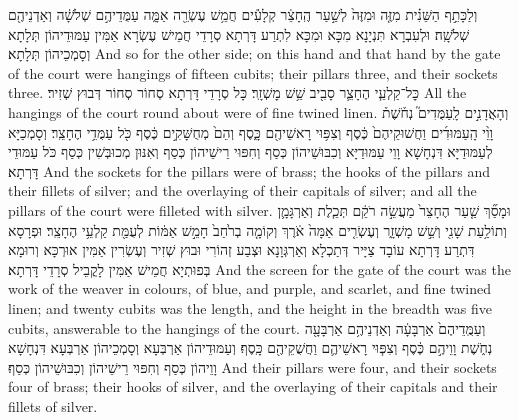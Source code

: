 {וְלַכָּתֵ֣ף הַשֵּׁנִ֗ית מִזֶּ֤ה וּמִזֶּה֙ לְשַׁ֣עַר הֶֽחָצֵ֔ר קְלָעִ֕ים חֲמֵ֥שׁ עֶשְׂרֵ֖ה אַמָּ֑ה עַמֻּדֵיהֶ֣ם שְׁלֹשָׁ֔ה וְאַדְנֵיהֶ֖ם שְׁלֹשָֽׁה׃}
{וּלְעִבְרָא תִּנְיָנָא מִכָּא וּמִכָּא לִתְרַע דָּרְתָא סְרָדֵי חֲמֵישׁ עֶשְׂרָא אַמִּין עַמּוּדֵיהוֹן תְּלָתָא וְסָמְכֵיהוֹן תְּלָתָא׃}
{And so for the other side; on this hand and that hand by the gate of the court were hangings of fifteen cubits; their pillars three, and their sockets three.}{}
{כׇּל־קַלְעֵ֧י הֶחָצֵ֛ר סָבִ֖יב שֵׁ֥שׁ מׇשְׁזָֽר׃}
{כָּל סְרָדֵי דָּרְתָא סְחוֹר סְחוֹר דְּבוּץ שְׁזִיר׃}
{All the hangings of the court round about were of fine twined linen.}{}
{וְהָאֲדָנִ֣ים לָֽעַמֻּדִים֮ נְחֹ֒שֶׁת֒ וָוֵ֨י הָֽעַמּוּדִ֜ים וַחֲשׁוּקֵיהֶם֙ כֶּ֔סֶף וְצִפּ֥וּי רָאשֵׁיהֶ֖ם כָּ֑סֶף וְהֵם֙ מְחֻשָּׁקִ֣ים כֶּ֔סֶף כֹּ֖ל עַמֻּדֵ֥י הֶחָצֵֽר׃}
{וְסָמְכַיָּא לְעַמּוּדַיָּא דִּנְחָשָׁא וָוֵי עַמּוּדַיָּא וְכִבּוּשֵׁיהוֹן כְּסַף וְחִפּוּי רֵישֵׁיהוֹן כְּסַף וְאִנּוּן מְכוּבְּשִׁין כְּסַף כֹּל עַמּוּדֵי דָּרְתָא׃}
{And the sockets for the pillars were of brass; the hooks of the pillars and their fillets of silver; and the overlaying of their capitals of silver; and all the pillars of the court were filleted with silver.}{}
{וּמָסַ֞ךְ שַׁ֤עַר הֶחָצֵר֙ מַעֲשֵׂ֣ה רֹקֵ֔ם תְּכֵ֧לֶת וְאַרְגָּמָ֛ן וְתוֹלַ֥עַת שָׁנִ֖י וְשֵׁ֣שׁ מָשְׁזָ֑ר וְעֶשְׂרִ֤ים אַמָּה֙ אֹ֔רֶךְ וְקוֹמָ֤ה בְרֹ֙חַב֙ חָמֵ֣שׁ אַמּ֔וֹת לְעֻמַּ֖ת קַלְעֵ֥י הֶחָצֵֽר׃
}
{וּפְרָסָא דִּתְרַע דָּרְתָא עוֹבָד צַיָּיר דְּתַכְלָא וְאַרְגְּוָנָא וּצְבַע זְהוֹרִי וּבוּץ שְׁזִיר וְעֶשְׂרִין אַמִּין אוּרְכָּא וְרוּמָא בְּפוּתְיָא חֲמֵישׁ אַמִּין לָקֳבֵיל סְרָדֵי דָּרְתָא׃}
{And the screen for the gate of the court was the work of the weaver in colours, of blue, and purple, and scarlet, and fine twined linen; and twenty cubits was the length, and the height in the breadth was five cubits, answerable to the hangings of the court.}{}
{וְעַמֻּֽדֵיהֶם֙ אַרְבָּעָ֔ה וְאַדְנֵיהֶ֥ם אַרְבָּעָ֖ה נְחֹ֑שֶׁת וָוֵיהֶ֣ם כֶּ֔סֶף וְצִפּ֧וּי רָאשֵׁיהֶ֛ם וַחֲשֻׁקֵיהֶ֖ם כָּֽסֶף׃}
{וְעַמּוּדֵיהוֹן אַרְבְּעָא וְסָמְכֵיהוֹן אַרְבְּעָא דִּנְחָשָׁא וָוֵיהוֹן כְּסַף וְחִפּוּי רֵישֵׁיהוֹן וְכִבּוּשֵׁיהוֹן כְּסַף׃}
{And their pillars were four, and their sockets four of brass; their hooks of silver, and the overlaying of their capitals and their fillets of silver.}{}

